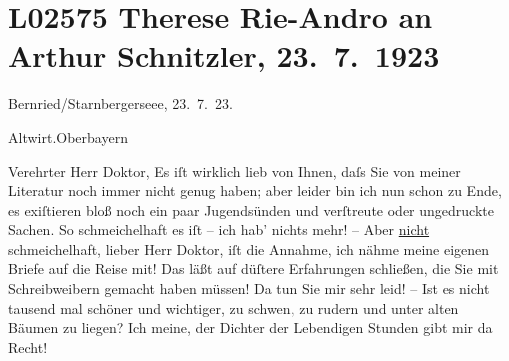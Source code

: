 

\section[Therese Rie-Andro an Arthur Schnitzler, 23. 7. 1923]{L02575 Therese Rie-Andro an Arthur Schnitzler, 23. 7. 1923}
\nopagebreak{}
\rehead{ }\normalsize\beginnumbering{}
\toendnotes[C]{\smallbreak\pagebreak[2]}
\toendnotes[C]{\smallbreak}
\pstart
           \raggedleft{}{\pb}Bernried/Starnbergerseee,
                     23. 7. 23. \pend
           
\pstart
           \raggedleft{}Altwirt.\hspace*{1.5em}Oberbayern\pend
           
\pstart{}Verehrter Herr Doktor,\pend\vspace{0.5em}
\pstart
           Es iſt wirklich lieb von Ihnen, daſs Sie von meiner Literatur noch immer nicht genug
               haben; aber leider bin ich nun schon zu Ende, es exiſtieren bloß noch ein paar
               Jugendsünden und verſtreute oder ungedruckte Sachen. So schmeichelhaft es iſt – ich
               hab’ nichts mehr! – Aber \uline{nicht} schmeichelhaft, lieber
               Herr Doktor, iſt die Annahme, ich nähme meine eigenen Briefe auf die Reise mit! Das
               läßt auf düſtere Erfahrungen schließen, die Sie mit Schreibweibern gemacht haben
               müssen! Da tun Sie mir sehr leid! – Ist es nicht tausend mal schöner und wichtiger,
               zu schw{\geminationm}en\textcolor{gray}{,} zu rudern und unter alten
               Bäumen zu liegen? Ich meine, der Dichter der Lebendigen Stunden gibt mir da Recht!\pend
           

